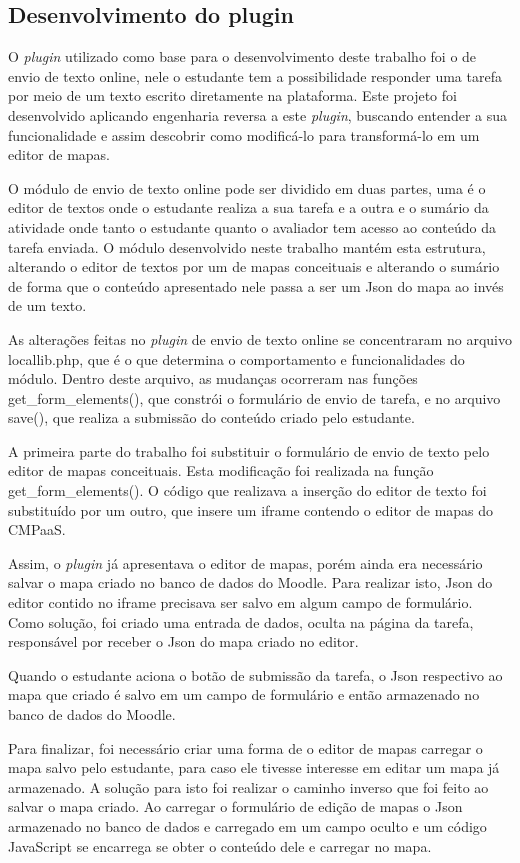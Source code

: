 \documentclass[
	12pt,				%
	openright,			%
	oneside,			%
	a4paper,			%
	english,			%
	french,				%
	spanish,			%
	brazil				%
	]{abntex2}
\begin{document}
\subsection{Desenvolvimento do plugin}
O \textit{plugin} utilizado como base para o desenvolvimento deste trabalho foi o de envio de texto online, nele o estudante tem a possibilidade responder uma tarefa por meio de um texto escrito diretamente na plataforma. Este projeto foi desenvolvido aplicando engenharia reversa a este \textit{plugin}, buscando entender a sua funcionalidade e assim descobrir como modificá-lo para transformá-lo em um editor de mapas.

O módulo de envio de texto online pode ser dividido em duas partes, uma é o editor de textos onde o estudante realiza a sua tarefa e a outra e o sumário da atividade onde tanto o estudante quanto o avaliador tem acesso ao conteúdo da tarefa enviada. O módulo desenvolvido neste trabalho mantém esta estrutura, alterando o editor de textos por um de mapas conceituais e alterando o sumário de forma que o conteúdo apresentado nele passa a ser um Json do mapa ao invés de um texto.

As alterações feitas no \textit{plugin} de envio de texto online se concentraram no arquivo locallib.php, que é o que determina o comportamento e funcionalidades do módulo. Dentro deste arquivo, as mudanças ocorreram nas funções get\_form\_elements(), que constrói o formulário de envio de tarefa, e no arquivo save(), que realiza a submissão do conteúdo criado pelo estudante.

A primeira parte do trabalho foi substituir o formulário de envio de texto pelo editor de mapas conceituais. Esta modificação foi realizada na função get\_form\_elements(). O código que realizava a inserção do editor de texto foi substituído por um outro, que insere um iframe contendo o editor de mapas do CMPaaS. 

Assim, o \textit{plugin} já apresentava o editor de mapas, porém ainda era necessário salvar o mapa criado no banco de dados do Moodle. Para realizar isto, Json do editor contido no iframe precisava ser salvo em algum campo de formulário. Como solução, foi criado uma entrada de dados, oculta na página da tarefa, responsável por receber o Json do mapa criado no editor.

Quando o estudante aciona o botão de submissão da tarefa, o Json respectivo ao mapa que criado é salvo em um campo de formulário e então armazenado no banco de dados do Moodle.

Para finalizar, foi necessário criar uma forma de o editor de mapas carregar o mapa salvo pelo estudante, para caso ele tivesse interesse em editar um mapa já armazenado. A solução para isto foi realizar o caminho inverso que foi feito ao salvar o mapa criado. Ao carregar o formulário de edição de mapas o Json armazenado no banco de dados e carregado em um campo oculto e um código JavaScript se encarrega se obter o conteúdo dele e carregar no mapa.
\end{document}
